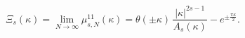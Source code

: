 \begin{equation}
\Xi_s(\kappa)=\lim_{N\to\infty} \mu_{s,N}^{11}(\kappa)=
\theta(\pm\kappa)\,\frac{|\kappa|^{2s-1}}{A_s(\kappa)}
-e^{\pm\frac{\pi\kappa}{2}}.
\end{equation}

